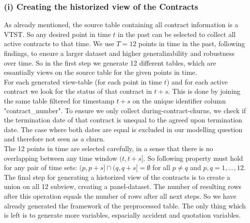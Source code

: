 \documentclass[12pt,titlepage]{article}
\begin{document}
\subsubsection*{(i) Creating the historized view of the Contracts}
As already mentioned, the source table containing all contract information is a VTST. So any desired point in time $t$ in the past can be selected to collect all active contracts to that time. We use $T=12$ points in time in the past, following \cite{multiplets} findings, to ensure a larger dataset and higher generalizability and robustness over time. So in the first step we generate 12 different tables, which are essantially views on the source table for the given points in time.\\
For each generated view-table (for each point in time $t$) and for each active contract we look for the status of that contract in $t+s$. This is done by joining the same table filtered for timestamp $t+s$ on the unique identifier column "contract\_number". To ensure we only collect during-contract-churns, we check if the termination date of that contract is unequal to the agreed upon termination date. The case where both dates are equal is excluded in our modelling question and therefore not seen as a churn. \\
The 12 points in time are selected carefully, in a sense that there is no overlapping between any time window $(t, t+s]$. So following property must hold for any pair of time sets: $(p, p+s] \cap (q, q+s] = \emptyset$ for all $p \neq q$ and $p,q=1,...,12$. \\
The final step for generating a historized view of the contracts is to create a union on all 12 subview, creating a panel-dataset. The number of resulting rows after this operation equals the number of rows after all next steps. So we have already generated the framework of the preprocessed table. The only thing which is left is to generate more variables, espacially accident and quotation variables. \\
\end{document}

